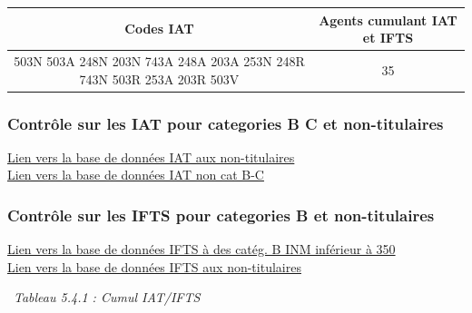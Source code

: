 \begin{longtable}[]{@{}cc@{}}
\toprule
Codes IAT & Agents cumulant IAT et IFTS\tabularnewline
\midrule
\endhead
503N 503A 248N 203N 743A 248A 203A 253N 248R 743N 503R 253A 203R 503V &
35\tabularnewline
\bottomrule
\end{longtable}

\hypertarget{controle-sur-les-iat-pour-categories-b-c-et-non-titulaires}{%
\subsubsection{Contrôle sur les IAT pour categories B C et
non-titulaires}\label{controle-sur-les-iat-pour-categories-b-c-et-non-titulaires}}

\href{../Bases/Reglementation/IAT.non.tit.csv}{Lien vers la base de données
IAT aux non-titulaires}\\
\href{../Bases/Reglementation/IAT.non.catBC.csv}{Lien vers la base de
données IAT non cat B-C}

\hypertarget{controle-sur-les-ifts-pour-categories-b-et-non-titulaires}{%
\subsubsection{Contrôle sur les IFTS pour categories B et
non-titulaires}\label{controle-sur-les-ifts-pour-categories-b-et-non-titulaires}}

\href{../Bases/Reglementation/IFTS.indice.anormal.csv}{Lien vers la base de
données IFTS à des catég. B INM inférieur à 350}\\
\href{../Bases/Reglementation/IFTS.non.tit.csv}{Lien vers la base de
données IFTS aux non-titulaires}

~\emph{Tableau 5.4.1 : Cumul IAT/IFTS}

